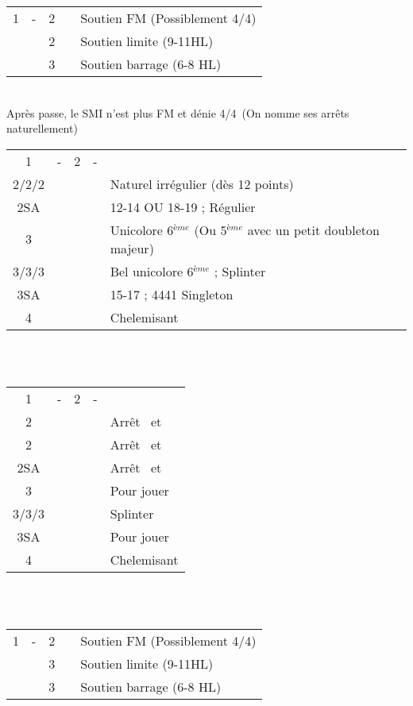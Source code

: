 \documentclass[a4paper, oneside, 11pt]{report}
\begin{document}
		\begin{tabular}{cccc|l}
		1\trefle & - & 2\trefle && Soutien FM (Possiblement 4\coeur/4\pique)\\	
		&& 2\carreau && Soutien limite (9-11HL)\\
		&& 3\trefle && Soutien barrage (6-8 HL)\\
		\end{tabular}\\
		Après passe, le SMI n'est plus FM et dénie 4\coeur/4\pique\ (On nomme ses arrêts naturellement)\\
	
		\begin{tabular}{cccc|l}
		1\trefle & - & 2\trefle & - &\\
		2\carreau/2\coeur/2\pique &&&& Naturel irrégulier (dès 12 points)\\
		2SA &&&& 12-14 OU 18-19 ; Régulier\\
		3\trefle &&&& Unicolore 6$^{ème}$ (Ou 5$^{ème}$ avec un petit doubleton majeur)\\
		3\carreau/3\coeur/3\pique &&&& Bel unicolore 6$^{ème}$ ; Splinter\\
		3SA &&&& 15-17 ; 4441 Singleton \carreau\\
		4\trefle &&&& Chelemisant \trefle\\
		\end{tabular}\\\\

		\begin{tabular}{cccc|l}
		1\trefle & - & 2\carreau & - &\\	
		2\coeur &&&& Arrêt \coeur\ et \carreau\\
		2\pique &&&& Arrêt \pique\ et \carreau\\
		2SA &&&& Arrêt \coeur\ et \pique\\
		3\trefle &&&& Pour jouer\\
		3\carreau/3\coeur/3\pique &&&& Splinter\\
		3SA &&&& Pour jouer\\
		4\trefle &&&& Chelemisant \trefle\\
		\end{tabular}\\\\

		\begin{tabular}{cccc|l}
		1\carreau & - & 2\carreau && Soutien FM (Possiblement 4\coeur/4\pique)\\
		&& 3\trefle && Soutien limite (9-11HL)\\
		&& 3\carreau && Soutien barrage (6-8 HL)\\
		\end{tabular}\\\\
\end{document}
